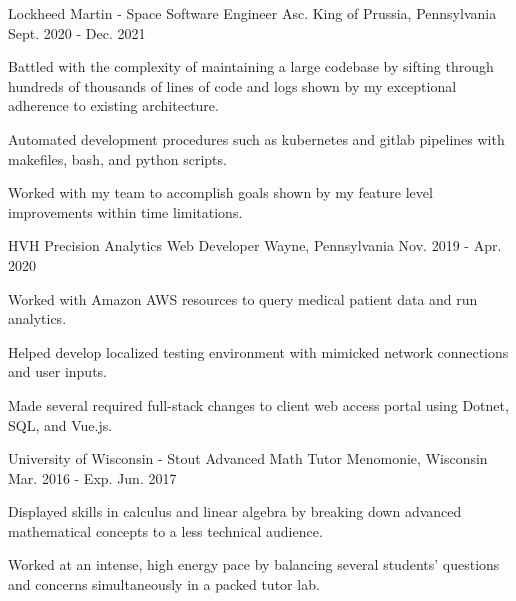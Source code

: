 \begin{cventries}
  \cventry
    {Lockheed Martin - Space} %
    {Software Engineer Asc.} %
    {King of Prussia, Pennsylvania} %
    {Sept. 2020 - Dec. 2021} %
    {
      \begin{cvitems} %
        \item {Battled with the complexity of maintaining a large codebase by sifting through hundreds of thousands of lines of code and logs shown by my exceptional adherence to existing architecture.}
        \item {Automated development procedures such as kubernetes and gitlab pipelines with makefiles, bash, and python scripts.}
        \item {Worked with my team to accomplish goals shown by my feature level improvements within time limitations.}
      \end{cvitems}
    }

  \cventry
    {HVH Precision Analytics} %
    {Web Developer} %
    {Wayne, Pennsylvania} %
    {Nov. 2019 - Apr. 2020} %
    {
      \begin{cvitems} %
        \item {Worked with Amazon AWS resources to query medical patient data and run analytics.}
        \item {Helped develop localized testing environment with mimicked network connections and user inputs.}
        \item {Made several required full-stack changes to client web access portal using Dotnet, SQL, and Vue.js.}
      \end{cvitems}
    }

  \cventry
    {University of Wisconsin - Stout} %
    {Advanced Math Tutor} %
    {Menomonie, Wisconsin} %
    {Mar. 2016 - Exp. Jun. 2017} %
    {
      \begin{cvitems} %
        \item {Displayed skills in calculus and linear algebra by breaking down advanced mathematical concepts to a less technical audience.}
        \item {Worked at an intense, high energy pace by balancing several students’ questions and concerns simultaneously in a packed tutor lab.}
      \end{cvitems}
    }


\end{cventries}

